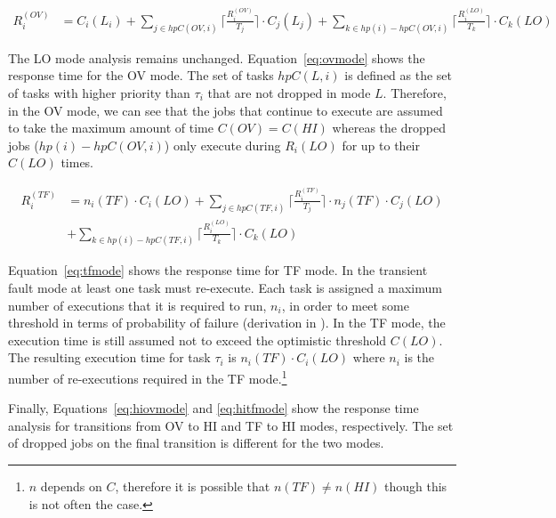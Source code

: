 \begin{equation}\label{eq:ovmode}
\begin{aligned}
R_i^{(OV)} &  = C_i(L_i)+\sum_{j \in hpC(OV,i)}\Big\lceil\frac{R_i^{(OV)}}{T_j}\Big\rceil \cdot C_j(L_j) 
 +\sum_{k \in hp(i)-hpC(OV,i)}\Big\lceil\frac{R_i^{(LO)}}{T_k}\Big\rceil \cdot C_k(LO)
\end{aligned}
\end{equation}
	
	
	The LO mode analysis remains unchanged. Equation~\ref{eq:ovmode} shows the response time for the OV mode. 
	The set of tasks $hpC(L,i)$ is defined as the set of tasks with higher priority than $\tau_i$ that are not dropped in mode $L$. 
	Therefore, in the OV mode, we can see that the jobs that continue to execute are assumed to take the maximum amount of time $C(OV)=C(HI)$ whereas the dropped jobs ($hp(i) - hpC(OV,i)$) only execute during $R_i(LO)$ for up to their $C(LO)$ times.
	
\begin{equation}\label{eq:tfmode}
\begin{aligned}
R_i^{(TF)} & = n_i(TF) \cdot C_i(LO)
+\sum_{j \in hpC(TF,i)}\Big\lceil\frac{R_i^{(TF)}}{T_j}\Big\rceil \cdot n_j(TF) \cdot C_j(LO) \\
&  +\sum_{k \in hp(i)-hpC(TF,i)}\Big\lceil\frac{R_i^{(LO)}}{T_k}\Big\rceil \cdot C_k(LO)
\end{aligned}
\end{equation}

	Equation~\ref{eq:tfmode} shows the response time for TF mode. 
	In the transient fault mode at least one task must re-execute. 
	Each task is assigned a maximum number of executions that it is required to run, $n_i$, in order to meet some threshold in terms of probability of failure (derivation in \cite{albayati2016modes}). 
	In the TF mode, the execution time is still assumed not to exceed the optimistic threshold $C(LO)$. 
	The resulting execution time for task $\tau_i$ is $n_i(TF) \cdot C_i(LO)$ where $n_i$ is the number of re-executions required in the TF mode.\footnote{$n$ depends on $C$, therefore it is possible that $n(TF) \ne n(HI)$ though this is not often the case.}

	Finally, Equations~\ref{eq:hiovmode} and \ref{eq:hitfmode} show the response time analysis for transitions from OV to HI and TF to HI modes, respectively. The set of dropped jobs on the final transition is different for the two modes.





